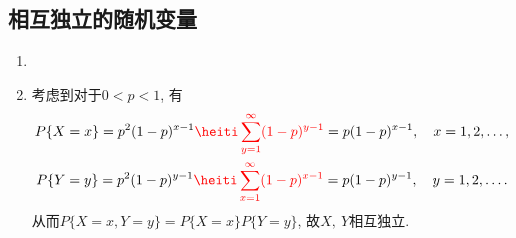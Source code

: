 \subsection{相互独立的随机变量}
\setcounter{prob}{16}
\begin{prob}
	\begin{enumerate}
	\item 	
	\item
	考虑到对于$0<p<1$, 有
	\begin{gather*}
		P\{X=x\}=p^2(1-p)^{x-1}\red{\sum_{y=1}^\infty (1-p)^{y-1}}=p(1-p)^{x-1},\quad x=1,2,\ldots,\\
		P\{Y=y\}=p^2(1-p)^{y-1}\red{\sum_{x=1}^\infty (1-p)^{x-1}}=p(1-p)^{y-1},\quad y=1,2,\ldots.
	\end{gather*}
	从而$P\{X=x,Y=y\}=P\{X=x\}P\{Y=y\}$, 故$X,~Y$相互独立.
	\end{enumerate}
\end{prob}
